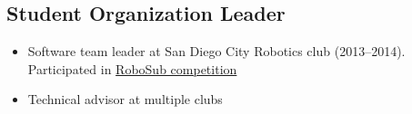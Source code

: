 \documentclass[10pt, letterpaper]{article}
\begin{document}
\begin{multicols}{2}
\begin{minipage}{0.5\textwidth}
    \subsection{Student Organization Leader}
    \begin{footnotesize}
      \begin{itemize}
        \item
          Software team leader at San Diego City Robotics club (2013--2014).
          Participated in
          \href{http://www.robonation.org/competition/robosub}{RoboSub competition}
        \item
          Technical advisor at multiple clubs
      \end{itemize}
    \end{footnotesize}
  \end{minipage}
\end{multicols}
\end{document}
